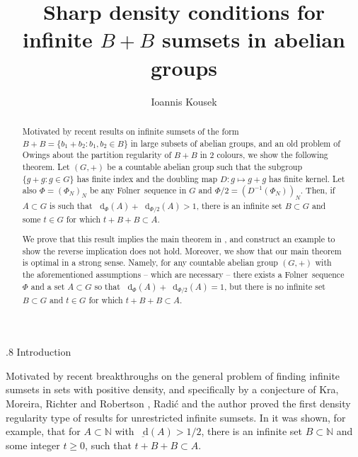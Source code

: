 \documentclass[reqno]{amsart}
\title{Sharp density conditions for infinite $B+B$ sumsets in abelian groups}
\author{Ioannis Kousek}
\date{}
\makeatletter
\def\N{{\mathbb N}}
\newcommand*\diff{\mathop{}\!\mathrm{d}}
\theoremstyle{definition}
\theoremstyle{remark}
\def\section{\@startsection{section}{1}%
  \z@{.5\linespacing\@plus.7\linespacing}
{.8\baselineskip}%
  {\normalfont\fontsize{11}{13}\centering\bfseries}%
}
\theoremstyle{remark}
\def\N{{\mathbb N}}
\newcommand{\Folner}{F\o{}lner}
\makeatother
\begin{document}
\begin{abstract}
Motivated by recent results \cite{charamaras_kousek_mountakis_radic2025BBingroups} on 
infinite sumsets of the form 
$B+B=\{b_1+b_2:b_1,b_2\in B\}$ in 
large subsets of abelian groups, and an old problem of Owings 
\cite[Problem E2494]{Owing_problems} about the partition regularity of $B+B$ in $2$ colours, we 
show the following theorem. Let $(G,+)$ be a countable abelian 
group such that the subgroup $\{g+g\colon g\in G\}$ has finite 
index and the doubling map $D: g\mapsto g+g$ has finite kernel. Let also $\Phi=(\Phi_N)_{N}$ be any \Folner\ sequence in $G$ and $\Phi/2=(D^{-1}(\Phi_N))_{N}$. Then, if 
$A\subset G$ is such that 
$\diff_{\Phi}(A)+\diff_{\Phi/2}(A)>1$, 
there is an infinite set $B\subset G$ and some $t\in G$ for 
which $t+B+B\subset A$.  

We prove that this result implies the main theorem in 
\cite{charamaras_kousek_mountakis_radic2025BBingroups}, and 
construct an example to show the reverse implication does not 
hold. Moreover, we show that our 
main theorem is optimal in a strong sense. Namely, for any 
countable abelian group $(G,+)$ with the aforementioned 
assumptions -- which are necessary -- there exists a \Folner\ sequence $\Phi$ and a set $A\subset G$ so that $\diff_{\Phi}(A)+\diff_{\Phi/2}(A)=1$, but there is no infinite set $B\subset G$ and $t\in G$ for which $t+B+B\subset A$. 
\end{abstract}

\maketitle

\tableofcontents

\section{Introduction}

Motivated by recent breakthroughs 
\cite{ Kra_Moreira_Richter_Robertson:2022, Kra_Moreira_Richter_Robertson:2023,Moreira_Richter_Robertson19} on the general problem of finding 
infinite sumsets in sets with positive density, and specifically by a conjecture of Kra, Moreira, Richter and Robertson \cite[Conjecture 3.7]{Kra_Moreira_Richter_Robertson_problems}, Radi{\'c} and the author \cite{kousek_radic2025BB} proved the first density regularity type of results for unrestricted infinite sumsets. In \cite[Theorems 1.2, 1.3]{kousek_radic2025BB} it was shown, for example, that for $A\subset \N$ with $\underline{\diff}(A)>1/2$, there is an infinite set $B\subset \N$ and some integer $t\geq 0$, such that $t+B+B\subset A$. 
\end{document}
